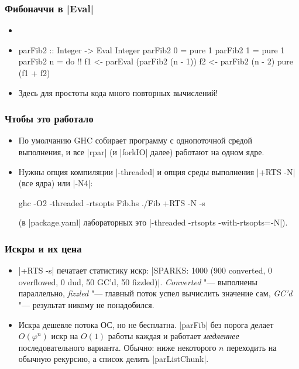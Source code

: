 \documentclass[11pt]{beamer}
\begin{document}
\begin{frame}[fragile]
  \frametitle{Фибоначчи в \haskinline|Eval|}
  \begin{itemize}
    \item
          \pause
    \item
          \begin{haskellsmall}
            parFib2 :: Integer -> Eval Integer
            parFib2 0 = pure 1
            parFib2 1 = pure 1
            parFib2 n = do !\pause!
              f1 <- parEval (parFib2 (n - 1))
              f2 <- parFib2 (n - 2)
              pure (f1 + f2)
          \end{haskellsmall}
          \pause
    \item Здесь для простоты кода много повторных вычислений!
  \end{itemize}
\end{frame}

\begin{frame}[fragile]
  \frametitle{Чтобы это работало}
  \begin{itemize}
    \item По умолчанию GHC собирает программу с однопоточной средой выполнения, и все \haskinline|rpar| (и \haskinline|forkIO| далее) работают на одном ядре.
    \item Нужны опция компиляции \ghcinline|-threaded| и опция среды выполнения \ghcinline|+RTS -N| (все ядра) или \ghcinline|-N4|:
          \begin{ghcismall}
            ghc -O2 -threaded -rtsopts Fib.hs
            ./Fib +RTS -N -s
          \end{ghcismall}
          (в \ghcinline|package.yaml| лабораторных это \ghcinline|-threaded -rtsopts -with-rtsopts=-N|).
  \end{itemize}
\end{frame}

\begin{frame}[fragile]
  \frametitle{Искры и их цена}
  \begin{itemize}
    \item \ghcinline|+RTS -s| печатает статистику искр: \ghcinline|SPARKS: 1000 (900 converted, 0 overflowed, 0 dud, 50 GC'd, 50 fizzled)|. \emph{Converted} "--- выполнены параллельно, \emph{fizzled} "--- главный поток успел вычислить значение сам, \emph{GC'd} "--- результат никому не понадобился.
          \pause
    \item Искра дешевле потока ОС, но не бесплатна. \haskinline|parFib| без порога делает $O(\varphi^n)$ искр на $O(1)$ работы каждая и работает \emph{медленнее} последовательного варианта. Обычно: ниже некоторого $n$ переходить на обычную рекурсию, а список делить \haskinline|parListChunk|.
  \end{itemize}
\end{frame}
\end{document}
